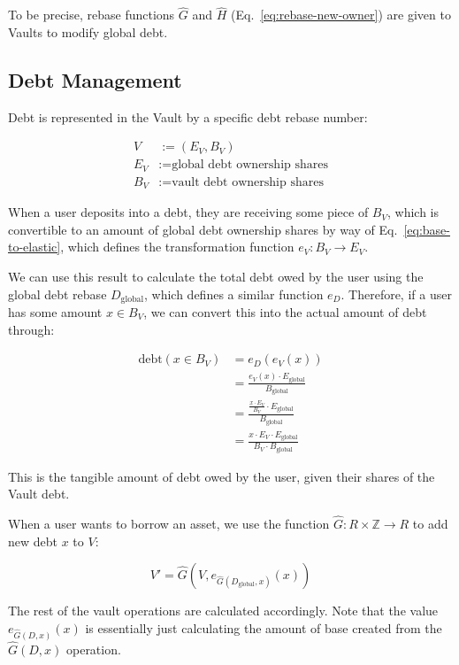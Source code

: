 \documentclass[letterpaper]{article}
\begin{document}
\begin{multicols}{2}
To be precise, rebase functions $\hat{G}$ and $\hat{H}$ (Eq.~\ref{eq:rebase-new-owner}) are given to Vaults to modify global debt.

\subsection{Debt Management}

Debt is represented in the Vault by a specific debt rebase number:

\begin{align}
    V &:= (E_{V}, B_{V}) \\
    E_{V} &:= \text{global debt ownership shares} \\
    B_{V} &:= \text{vault debt ownership shares}
\end{align}

When a user deposits into a debt, they are receiving some piece of $B_{V}$, which is convertible to an amount of global debt ownership shares by way of Eq.~\ref{eq:base-to-elastic}, which defines the transformation function $e_V: B_V \rightarrow E_V$.

We can use this result to calculate the total debt owed by the user using the global debt rebase $D_{\text{global}}$, which defines a similar function $e_D$. Therefore, if a user has some amount $x \in B_V$, we can convert this into the actual amount of debt through:

\begin{align}
    \text{debt}(x \in B_V) &= e_D(e_V(x)) \\
    &= \frac{e_V(x) \cdot E_{\text{global}}}{B_{\text{global}}} \\
    &= \frac{\frac{x \cdot E_V}{B_V} \cdot E_{\text{global}}}{B_{\text{global}}} \\
    &= \frac{x \cdot E_V \cdot E_{\text{global}}}{B_V \cdot B_{\text{global}}}
\end{align}

This is the tangible amount of debt owed by the user, given their shares of the Vault debt.

When a user wants to borrow an asset, we use the function $\hat{G}: R \times \mathbb{Z} \rightarrow R$ to add new debt $x$ to $V$:

\begin{equation}
    V' = \hat{G}(V, e_{\hat{G}(D_{\text{global}}, x)}(x))
\end{equation}

The rest of the vault operations are calculated accordingly. Note that the value $e_{\hat{G}(D, x)}(x)$ is essentially just calculating the amount of base created from the $\hat{G}(D, x)$ operation.


\end{multicols}
\end{document}
